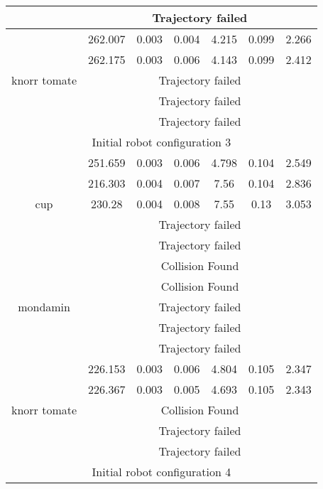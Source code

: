 {\begin{center}
\begin{longtable}[c]{ | c | c | c | c | c | c || c || }
& \multicolumn{6}{c|}{Trajectory failed} \\ 
\hline\multirow{5}{1.7cm}{knorr tomate}& 262.007 & 0.003 & 0.004 & 4.215 & 0.099 & 2.266 \\ 
& 262.175 & 0.003 & 0.006 & 4.143 & 0.099 & 2.412 \\ 
& \multicolumn{6}{c|}{Trajectory failed} \\ 
& \multicolumn{6}{c|}{Trajectory failed} \\ 
& \multicolumn{6}{c|}{Trajectory failed} \\ 
\hline
\multicolumn{7}{|c|}{Initial robot configuration 3} \\
\hline
\multirow{5}{1.7cm}{cup}& 251.659 & 0.003 & 0.006 & 4.798 & 0.104 & 2.549 \\ 
& 216.303 & 0.004 & 0.007 & 7.56 & 0.104 & 2.836 \\ 
& 230.28 & 0.004 & 0.008 & 7.55 & 0.13 & 3.053 \\ 
& \multicolumn{6}{c|}{Trajectory failed} \\ 
& \multicolumn{6}{c|}{Trajectory failed} \\ 
\hline\multirow{5}{1.7cm}{mondamin}& \multicolumn{6}{c|}{Collision Found} \\ 
& \multicolumn{6}{c|}{Collision Found} \\ 
& \multicolumn{6}{c|}{Trajectory failed} \\ 
& \multicolumn{6}{c|}{Trajectory failed} \\ 
& \multicolumn{6}{c|}{Trajectory failed} \\ 
\hline\multirow{5}{1.7cm}{knorr tomate}& 226.153 & 0.003 & 0.006 & 4.804 & 0.105 & 2.347 \\ 
& 226.367 & 0.003 & 0.005 & 4.693 & 0.105 & 2.343 \\ 
& \multicolumn{6}{c|}{Collision Found} \\ 
& \multicolumn{6}{c|}{Trajectory failed} \\ 
& \multicolumn{6}{c|}{Trajectory failed} \\ 
\hline
\multicolumn{7}{|c|}{Initial robot configuration 4} \\
\hline

\hline 

\end{longtable}
\end{center}
}
